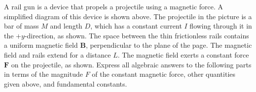 \documentclass{../../oss-apphys-exam}
\begin{document}
\begin{questions}
  
  \question A rail gun is a device that propels a projectile using a magnetic
  force. A simplified diagram of this device is shown above. The projectile in
  the picture is a bar of mass $M$ and length $D$, which has a constant current
  $I$ flowing through it in the $+y$-direction, as shown. The space between the
  thin frictionless rails contains a uniform magnetic field $\mathbf B$,
  perpendicular to the plane of the page. The magnetic field and rails extend
  for a distance $L$. The magnetic field exerts a constant force $\mathbf F$ on
  the projectile, as shown.
  Express all algebraic answers to the following parts in terms of the
  magnitude $F$ of the constant magnetic force, other quantities given above,
  and fundamental constants.
\end{questions}
\end{document}
